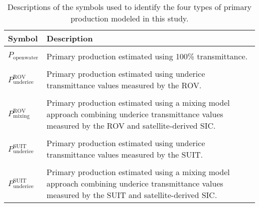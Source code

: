 \begin{table}[]
	\centering
	\begin{tabular}{l L{12cm}}
		\toprule
		\textbf{Symbol}                             & \textbf{Description}                                                                                                                               \\
		\toprule                                                                                                                                                                                         \\
		$P_\text{openwater}$                & Primary production estimated using 100\% transmittance.                                                                                            \\
		\hline                                                                                                                                                                                           \\
		$P^{\text{ROV}}_{\text{underice}}$  & Primary production estimated using underice transmittance values measured by the ROV.                                                              \\
		\hline                                                                                                                                                                                           \\
		$P^{\text{ROV}}_{\text{mixing}}$    & Primary production estimated using a mixing model approach combining underice transmittance values measured by the ROV and satellite-derived SIC.  \\
		\hline                                                                                                                                                                                           \\
		$P^{\text{SUIT}}_{\text{underice}}$ & Primary production estimated using underice transmittance values measured by the SUIT.                                                             \\
		\hline                                                                                                                                                                                           \\
		$P^{\text{SUIT}}_{\text{underice}}$ & Primary production estimated using a mixing model approach combining underice transmittance values measured by the SUIT and satellite-derived SIC. \\
		\toprule
	\end{tabular}
	\caption{Descriptions of the symbols used to identify the four types of primary production modeled in this study.}
\end{table}
